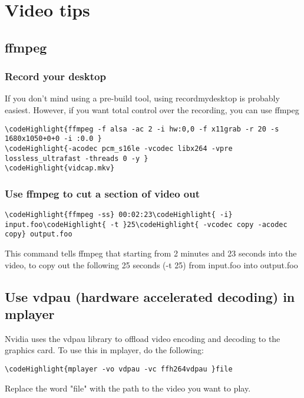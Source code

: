 \documentclass[12pt,a4paper]{article}
\begin{document}
\section{Video tips}
\subsection{ffmpeg}
\subsubsection{Record your desktop}
If you don't mind using a pre-build tool, using recordmydesktop is probably easiest. However, if you want total control over the recording, you can use ffmpeg
\begin{Verbatim}[commandchars=\\\{\}]
\codeHighlight{ffmpeg -f alsa -ac 2 -i hw:0,0 -f x11grab -r 20 -s 1680x1050+0+0 -i :0.0 }
\codeHighlight{-acodec pcm_s16le -vcodec libx264 -vpre lossless_ultrafast -threads 0 -y }
\codeHighlight{vidcap.mkv}
\end{Verbatim}

\subsubsection{Use ffmpeg to cut a section of video out}
\begin{Verbatim}[commandchars=\\\{\}]
\codeHighlight{ffmpeg -ss} 00:02:23\codeHighlight{ -i} input.foo\codeHighlight{ -t }25\codeHighlight{ -vcodec copy -acodec copy} output.foo
\end{Verbatim}
This command tells ffmpeg that starting from 2 minutes and 23 seconds into the video, to copy out the following 25 seconds (-t 25) from input.foo into output.foo

\subsection{Use vdpau (hardware accelerated decoding) in mplayer}
Nvidia uses the vdpau library to offload video encoding and decoding to the graphics card.  To use this in mplayer, do the following:
\begin{Verbatim}[commandchars=\\\{\}]
\codeHighlight{mplayer -vo vdpau -vc ffh264vdpau }file
\end{Verbatim}
Replace the word "file" with the path to the video you want to play.
\end{document}
